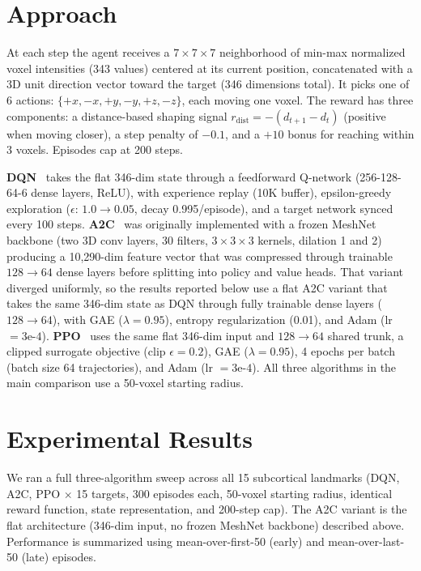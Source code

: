 \documentclass[11pt]{article}
\begin{document}
\section{Approach}

At each step the agent receives a $7 \times 7 \times 7$ neighborhood of min-max normalized voxel intensities (343 values) centered at its current position, concatenated with a 3D unit direction vector toward the target (346 dimensions total). It picks one of 6 actions: $\{+x, -x, +y, -y, +z, -z\}$, each moving one voxel. The reward has three components: a distance-based shaping signal $r_{\text{dist}} = -(d_{t+1} - d_t)$ (positive when moving closer), a step penalty of $-0.1$, and a $+10$ bonus for reaching within 3 voxels. Episodes cap at 200 steps.

\textbf{DQN}~\cite{mnih2015} takes the flat 346-dim state through a feedforward Q-network (256-128-64-6 dense layers, ReLU), with experience replay (10K buffer), epsilon-greedy exploration ($\epsilon$: $1.0 \to 0.05$, decay 0.995/episode), and a target network synced every 100 steps. \textbf{A2C}~\cite{mnih2016} was originally implemented with a frozen MeshNet backbone (two 3D conv layers, 30 filters, $3 \times 3 \times 3$ kernels, dilation 1 and 2) producing a 10{,}290-dim feature vector that was compressed through trainable $128 \to 64$ dense layers before splitting into policy and value heads. That variant diverged uniformly, so the results reported below use a flat A2C variant that takes the same 346-dim state as DQN through fully trainable dense layers ($128 \to 64$), with GAE ($\lambda = 0.95$), entropy regularization (0.01), and Adam (lr $= 3\text{e-}4$). \textbf{PPO}~\cite{schulman2017} uses the same flat 346-dim input and $128 \to 64$ shared trunk, a clipped surrogate objective (clip $\epsilon = 0.2$), GAE ($\lambda = 0.95$), 4 epochs per batch (batch size 64 trajectories), and Adam (lr $= 3\text{e-}4$). All three algorithms in the main comparison use a 50-voxel starting radius.

\section{Experimental Results}

We ran a full three-algorithm sweep across all 15 subcortical landmarks (DQN, A2C, PPO $\times$ 15 targets, 300 episodes each, 50-voxel starting radius, identical reward function, state representation, and 200-step cap). The A2C variant is the flat architecture (346-dim input, no frozen MeshNet backbone) described above. Performance is summarized using mean-over-first-50 (early) and mean-over-last-50 (late) episodes.
\end{document}
